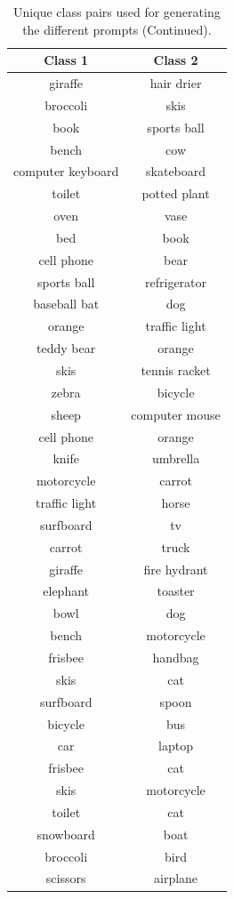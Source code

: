 \begin{table}[ht]
\centering
\begin{tabular}{cc}
\toprule
Class 1 & Class 2 \\
\midrule
giraffe & hair drier \\
broccoli & skis \\
book & sports ball \\
bench & cow \\
computer keyboard & skateboard \\
toilet & potted plant \\
oven & vase \\
bed & book \\
cell phone & bear \\
sports ball & refrigerator \\
baseball bat & dog \\
orange & traffic light \\
teddy bear & orange \\
skis & tennis racket \\
zebra & bicycle \\
sheep & computer mouse \\
cell phone & orange \\
knife & umbrella \\
motorcycle & carrot \\
traffic light & horse \\
surfboard & tv \\
carrot & truck \\
giraffe & fire hydrant \\
elephant & toaster \\
bowl & dog \\
bench & motorcycle \\
frisbee & handbag \\
skis & cat \\
surfboard & spoon \\
bicycle & bus \\
car & laptop \\
frisbee & cat \\
skis & motorcycle \\
toilet & cat \\
snowboard & boat \\
broccoli & bird \\
scissors & airplane \\
\bottomrule
\end{tabular}
\caption{Unique class pairs used for generating the different prompts (Continued).}
\label{tab:class_pairs}
\end{table}


